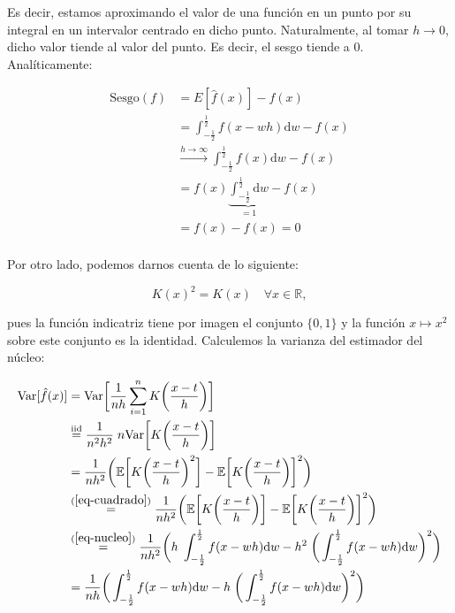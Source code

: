 \documentclass[a4paper]{article}
\newcommand{\R}{\mathbb{R}}
\newcommand{\E}{\mathbb{E}}
\newcommand{\Var}{\text{Var}}
\begin{document}
Es decir, estamos aproximando el valor de una función en un punto por su integral en un intervalor centrado en dicho punto. Naturalmente, al tomar $h \rightarrow 0$, dicho valor tiende al valor del punto. Es decir, el sesgo tiende a $0$. Analíticamente:

\begin{align*}
	\text{Sesgo}(f) & = E [ \hat f(x) ] - f(x) \\
	& = \int_{-\frac{1}{2}}^{\frac{1}{2}} f(x - wh) \text{d}w - f(x) \\
	& \stackrel{h \rightarrow \infty}{\longrightarrow} \int_{-\frac{1}{2}}^{\frac{1}{2}} f(x) \text{d}w - f(x) \\
	& =  f(x) \underbrace{\int_{-\frac{1}{2}}^{\frac{1}{2}} \text{d}w}_{= 1} - f(x) \\
	& =  f(x) - f(x) = 0 \\
\end{align*}

Por otro lado, podemos darnos cuenta de lo siguiente:

\begin{equation}
	\label{eq-cuadrado}
	K(x)^2 = K(x) \quad \forall x \in \R,
\end{equation}

pues la función indicatriz tiene por imagen el conjunto $\{0,1\}$ y la función $x \mapsto x^2$ sobre este conjunto es la identidad. Calculemos la varianza del estimador del núcleo:

\begin{align*}
	\Var [ \hat f(x)] & = \Var \bigg[ \frac{1}{nh} \sum_{i=1}^n K\bigg(\frac{x - t}{h}\bigg) \bigg] \\
	& \stackrel{\text{iid}}{=} \frac{1}{n^2 h^2} \; n \Var \bigg[ K\bigg(\frac{x - t}{h}\bigg) \bigg] \\
	& = \frac{1}{n h^2} \bigg( \E \bigg[ K\bigg(\frac{x - t}{h}\bigg)^2 \bigg] - \E \bigg[ K\bigg(\frac{x - t}{h}\bigg) \bigg]^2 \bigg)  \\
	& \stackrel{(\ref{eq-cuadrado})}{=} \frac{1}{n h^2} \bigg( \E \bigg[ K\bigg(\frac{x - t}{h}\bigg) \bigg] - \E \bigg[ K\bigg(\frac{x - t}{h}\bigg) \bigg]^2 \bigg)  \\
	& \stackrel{(\ref{eq-nucleo})}{=} \frac{1}{n h^2} \bigg( h \; \int_{-\frac{1}{2}}^{\frac{1}{2}} f(x - wh) \text{d}w - h^2 \; \bigg( \int_{-\frac{1}{2}}^{\frac{1}{2}} f(x - wh) \text{d}w\bigg) ^2 \bigg) \\
	& = \frac{1}{n h} \bigg( \int_{-\frac{1}{2}}^{\frac{1}{2}} f(x - wh) \text{d}w - h \; \bigg( \int_{-\frac{1}{2}}^{\frac{1}{2}} f(x - wh) \text{d}w\bigg) ^2 \bigg) \\
\end{align*}
\end{document}
